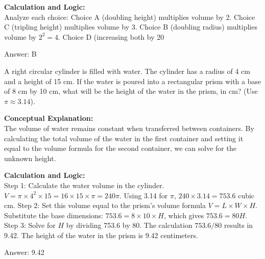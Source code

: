 \documentclass[11pt,paper=a4,answers]{exam}
\begin{document}
\begin{questions}
\begin{solution}
\vspace{30pt}

\textbf{Calculation and Logic:} \\
Analyze each choice: Choice A (doubling height) multiplies volume by 2. Choice C (tripling height) multiplies volume by 3. Choice B (doubling radius) multiplies volume by $2^2 = 4$. Choice D (increasing both by 20%

\vspace{30pt}

Answer: \colorbox{yellow!100}{B}
\end{solution}

\vspace{60pt}

\question
A right circular cylinder is filled with water. The cylinder has a radius of 4 cm and a height of 15 cm. If the water is poured into a rectangular prism with a base of 8 cm by 10 cm, what will be the height of the water in the prism, in cm? (Use $\pi \approx 3.14$).

\begin{solution}
\textbf{Conceptual Explanation:} \\
The volume of water remains constant when transferred between containers. By calculating the total volume of the water in the first container and setting it equal to the volume formula for the second container, we can solve for the unknown height.

\vspace{30pt}

\textbf{Calculation and Logic:} \\
Step 1: Calculate the water volume in the cylinder. $V = \pi \times 4^2 \times 15 = 16 \times 15 \times \pi = 240\pi$. Using 3.14 for $\pi$, $240 \times 3.14 = 753.6$ cubic cm. Step 2: Set this volume equal to the prism's volume formula $V = L \times W \times H$. Substitute the base dimensions: $753.6 = 8 \times 10 \times H$, which gives $753.6 = 80H$. Step 3: Solve for $H$ by dividing 753.6 by 80. The calculation $753.6 / 80$ results in 9.42. The height of the water in the prism is 9.42 centimeters.

\vspace{30pt}

Answer: \colorbox{yellow!100}{9.42}
\end{solution}


\end{questions}
\end{document}
